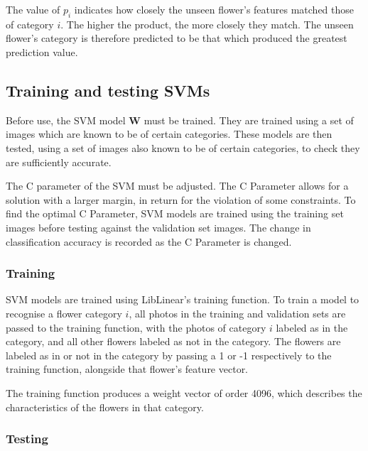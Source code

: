 \documentclass[11pt, a4paper]{report}
\newcommand{\vect}[1]{\boldsymbol{#1}}
\begin{document}
The value of $p_{i}$ indicates how closely the unseen flower's features matched those of category $i$. The higher the product, the more closely they match. The unseen flower's category is therefore predicted to be that which produced the greatest prediction value. 



\subsection{Training and testing SVMs}

Before use, the SVM model $\vect{W}$ must be trained. They are trained using a set of images which are known to be of certain categories. These models are then tested, using a set of images also known to be of certain categories, to check they are sufficiently accurate. 

The C parameter of the SVM must be adjusted. The C Parameter allows for a solution with a larger margin, in return for the violation of some constraints. To find the optimal C Parameter, SVM models are trained using the training set images  before testing against the validation set images. The change in classification accuracy is recorded as the C Parameter is changed. 



\subsubsection{Training} 

SVM models are trained using LibLinear's training function. To train a model to recognise a flower category $i$, all photos in the training and validation sets are passed to the training function, with the photos of category $i$ labeled as in the category, and all other flowers labeled as not in the category. The flowers are labeled as in or not in the category by passing a 1 or -1 respectively to the training function, alongside that flower's feature vector.

The training function produces a weight vector of order 4096, which describes the characteristics of the flowers in that category. %

\subsubsection{Testing}
\end{document}
